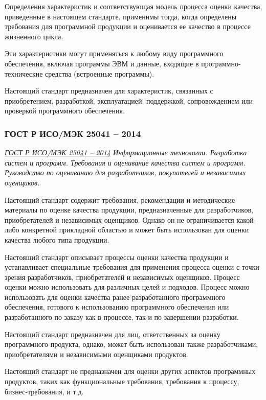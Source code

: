 Определения характеристик и соответствующая модель процесса оценки качества,
приведенные в настоящем стандарте, применимы тогда,
когда определены требования для программной продукции
и оценивается ее качество в процессе жизненного цикла.

Эти характеристики могут применяться к любому виду программного обеспечения,
включая программы ЭВМ и данные,
входящие в программно-технические средства (встроенные программы).

Настоящий стандарт предназначен для характеристик,
связанных с приобретением, разработкой, эксплуатацией, поддержкой,
сопровождением или проверкой программного обеспечения.

\subsubsection{ГОСТ Р ИСО/МЭК 25041 -- 2014}

\emph{\href{https://docs.cntd.ru/document/1200111122}
{ГОСТ Р ИСО/МЭК 25041 -- 2014}
Информационные технологии.
Разработка систем и программ.
Требования и оценивание качества систем и программ.
Руководство по оцениванию для разработчиков, покупателей и независимых оценщиков.
}

Настоящий стандарт содержит требования,
рекомендации и методические материалы по оценке качества продукции,
предназначенные для разработчиков, приобретателей и независимых оценщиков.
Однако он не ограничивается какой-либо конкретной прикладной областью
и может быть использован для оценки качества любого типа продукции.

Настоящий стандарт описывает процессы оценки качества продукции
и устанавливает специальные требования
для применения процесса оценки с точки зрения разработчиков,
приобретателей и независимых оценщиков.
Процесс оценки можно использовать для различных целей и подходов.
Процесс можно использовать
для оценки качества ранее разработанного программного обеспечения,
готового к использованию программного обеспечения
или разработанного по заказу как в процессе, так и по завершении разработки.

Настоящий стандарт предназначен для лиц,
ответственных за оценку программного продукта, однако,
может быть использован также разработчиками,
приобретателями и независимыми оценщиками продуктов.

Настоящий стандарт не предназначен
для оценки других аспектов программных продуктов,
таких как функциональные требования,
требования к процессу, бизнес-требования, и т.д.

